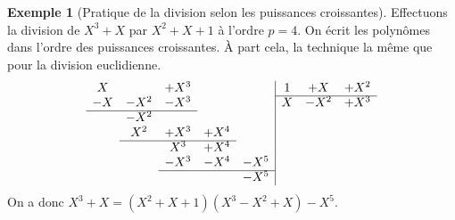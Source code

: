 \documentclass[french]{book}
\theoremstyle{plain}
\theoremstyle{definition}
\newtheorem{exa}{Exemple}[chapter]
\theoremstyle{remark}
\begin{document}
\begin{exa}[Pratique de la division selon les puissances croissantes]
	Effectuons la division de $X^{3}+X$ par $X^{2}+X+1$ à l'ordre $p=4$. On écrit les polynômes dans l'ordre des puissances croissantes. À part cela, la technique la même que pour la division euclidienne.
	$$\begin{array}{ccccc|ccc}
		X&&+X^3&&&1&+X&+X^2 \\
		\cline{6-8}
		-X&-X^2&-X^3&&&X&-X^2&+X^3 \\
		\cline{1-3}
		&-X^2&&&&&& \\
		&X^2&+X^3&+X^4&&&& \\
		\cline{2-4}
		&&X^3&+X^4&&&& \\
		&&-X^3&-X^4&-X^5&&& \\
		\cline{3-5}
		&&&&-X^5&&&
	\end{array}$$
	On a donc $X^{3}+X=(X^{2}+X+1)(X^{3}-X^{2}+X)-X^{5}$.
\end{exa}
\end{document}

